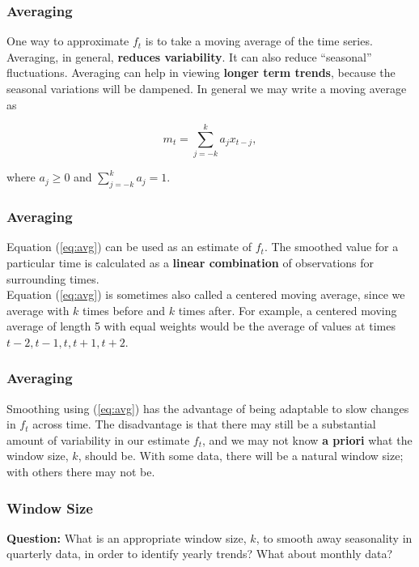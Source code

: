 \documentclass[%
xcolor=pdftex]{beamer}
\begin{document}
\begin{frame}
\frametitle{Averaging}

One way to approximate $f_t$ is to take a moving average of the time series.  Averaging, in general, \textbf{reduces variability}.  It can also reduce ``seasonal'' fluctuations. Averaging can help in viewing \textbf{longer term trends}, because the seasonal variations will be dampened.  In general we may write a moving average as

\begin{equation} \label{eq:avg}
m_t=\sum_{j=-k}^{k} a_j x_{t-j},
\end{equation}

where $a_j \geq 0$ and $\sum_{j=-k}^k a_j = 1$.

\end{frame}

\begin{frame}
\frametitle{Averaging}

Equation (\ref{eq:avg}) can be used as an estimate of $f_t$. The smoothed value for a particular time is calculated as a \textbf{linear combination} of observations for surrounding times. \\
\vspace{5mm}
Equation (\ref{eq:avg}) is sometimes also called a centered moving average, since we average with $k$ times before and $k$ times after. For example, a centered moving average of length 5 with equal weights would be the average of values at times $t-2, t-1, t, t+1, t+2$.

\end{frame}

\begin{frame}
\frametitle{Averaging}

Smoothing using (\ref{eq:avg}) has the advantage of being adaptable to slow changes in $f_t$ across time.  The disadvantage is that there may still be a substantial amount of variability in our estimate $f_t$, and we may not know {\bf a priori} what the window size, $k$, should be.  With some data, there will be a natural window size; with others there may not be.

\end{frame}

\begin{frame}
\frametitle{Window Size}

\textbf{Question:} What is an appropriate window size, $k$, to smooth away seasonality in quarterly data, in order to identify yearly trends? What about monthly data? 


\vspace{50mm}



\end{frame}
\end{document}
